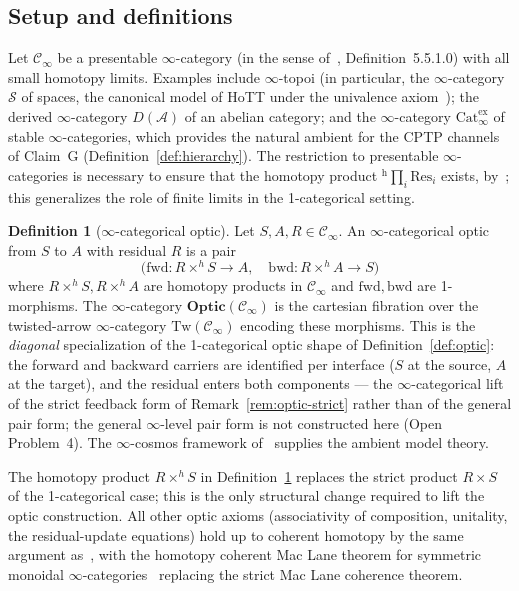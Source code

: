 \documentclass[11pt,a4paper]{article}
\theoremstyle{plain}
\theoremstyle{definition}
\newtheorem{definition}[theorem]{Definition}
\theoremstyle{remark}
\newcommand{\Optic}{\mathbf{Optic}}
\begin{document}
\subsection{Setup and definitions}

Let $\mathcal{C}_\infty$ be a presentable $\infty$-category (in the
sense of~\cite{lurie2009htt}, Definition~5.5.1.0) with all small
homotopy limits. Examples include $\infty$-topoi (in particular, the
$\infty$-category $\mathcal{S}$ of spaces, the canonical model of HoTT
under the univalence axiom~\cite{hottbook2013}); the derived
$\infty$-category $D(\mathcal{A})$ of an abelian category; and the
$\infty$-category $\mathrm{Cat}^{\mathrm{ex}}_\infty$ of stable
$\infty$-categories, which provides the natural ambient for the CPTP
channels of Claim~G (Definition~\ref{def:hierarchy}). The restriction to
presentable $\infty$-categories is necessary to ensure that the
homotopy product ${}^{\mathrm{h}}\!\prod_i \mathrm{Res}_i$ exists, by~\cite[Proposition
5.5.3.1]{lurie2009htt}; this generalizes the role of finite limits in
the 1-categorical setting.

\begin{definition}[$\infty$-categorical optic]
\label{def:hott-optic}
Let $S, A, R \in \mathcal{C}_\infty$. An $\infty$-categorical optic
from $S$ to $A$ with residual $R$ is a pair
\[
\bigl(\mathrm{fwd}: R \times^h S \to A, \quad
      \mathrm{bwd}: R \times^h A \to S\bigr)
\]
where $R \times^h S, R \times^h A$ are homotopy products in
$\mathcal{C}_\infty$ and $\mathrm{fwd}, \mathrm{bwd}$ are 1-morphisms.
The $\infty$-category $\Optic(\mathcal{C}_\infty)$ is the cartesian
fibration over the twisted-arrow $\infty$-category
$\mathrm{Tw}(\mathcal{C}_\infty)$ encoding these morphisms. This is the
\emph{diagonal} specialization of the 1-categorical optic shape of
Definition~\ref{def:optic}: the forward and backward carriers are
identified per interface ($S$ at the source, $A$ at the target), and
the residual enters both components --- the $\infty$-categorical
lift of the strict feedback form of
Remark~\ref{rem:optic-strict} rather than of the general pair
form; the general $\infty$-level pair form is not constructed here
(Open Problem~4). The $\infty$-cosmos framework
of~\cite{riehlverity2022} supplies the ambient model theory.
\end{definition}

The homotopy product $R \times^h S$ in
Definition~\ref{def:hott-optic} replaces the strict product $R \times S$
of the 1-categorical case; this is the only structural change required
to lift the optic construction. All other optic axioms (associativity of
composition, unitality, the residual-update equations) hold up to
coherent homotopy by the same argument as~\cite[Proposition~2.3]
{riley2018optics}, with the homotopy coherent Mac Lane theorem for
symmetric monoidal $\infty$-categories~\cite[Theorem~2.4.3]
{lurie2017ha} replacing the strict Mac Lane coherence theorem.
\end{document}
